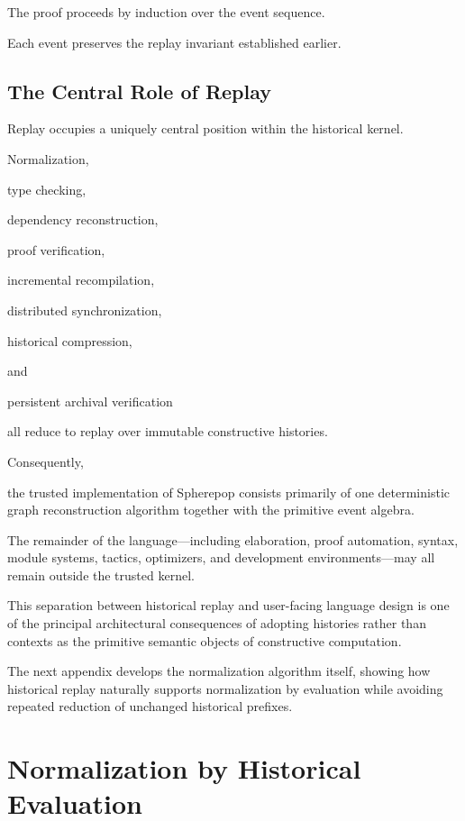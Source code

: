 \documentclass[12pt,oneside]{article}
\theoremstyle{definition}
\theoremstyle{remark}
\begin{document}
The proof proceeds by induction over the event sequence.

Each event preserves the replay invariant established earlier.


\subsection{The Central Role of Replay}

Replay occupies a uniquely central position within the historical kernel.

Normalization,

type checking,

dependency reconstruction,

proof verification,

incremental recompilation,

distributed synchronization,

historical compression,

and

persistent archival verification

all reduce to replay over immutable constructive histories.

Consequently,

the trusted implementation of Spherepop consists primarily of one deterministic
graph reconstruction algorithm together with the primitive event algebra.

The remainder of the language—including elaboration, proof automation, syntax,
module systems, tactics, optimizers, and development environments—may all remain
outside the trusted kernel.

This separation between historical replay and user-facing language design is one
of the principal architectural consequences of adopting histories rather than
contexts as the primitive semantic objects of constructive computation.

The next appendix develops the normalization algorithm itself, showing how
historical replay naturally supports normalization by evaluation while avoiding
repeated reduction of unchanged historical prefixes.

\section{Normalization by Historical Evaluation}
\end{document}
